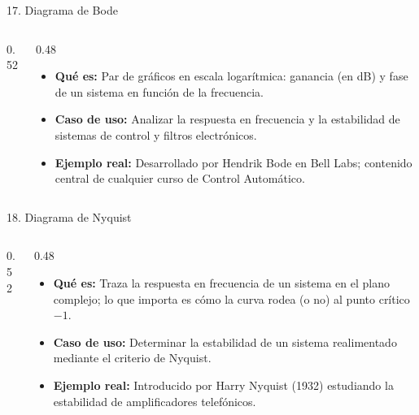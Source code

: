 \documentclass[aspectratio=169,9pt]{beamer}
\newcommand{\ficha}[3]{%
\begin{itemize}
\item \textbf{Qué es:} #1
\item \textbf{Caso de uso:} #2
\item \textbf{Ejemplo real:} #3
\end{itemize}}
\begin{document}
\begin{frame}{17. Diagrama de Bode}
\begin{columns}[T]
\begin{column}{0.52\textwidth}
\centering
{}
\end{column}
\begin{column}{0.48\textwidth}
\ficha{Par de gráficos en escala logarítmica: ganancia (en dB) y fase de un sistema en función de la frecuencia.}
{Analizar la respuesta en frecuencia y la estabilidad de sistemas de control y filtros electrónicos.}
{Desarrollado por Hendrik Bode en Bell Labs; contenido central de cualquier curso de Control Automático.}
\end{column}
\end{columns}
\end{frame}

\begin{frame}{18. Diagrama de Nyquist}
\begin{columns}[T]
\begin{column}{0.52\textwidth}
\centering
{}
\end{column}
\begin{column}{0.48\textwidth}
\ficha{Traza la respuesta en frecuencia de un sistema en el plano complejo; lo que importa es cómo la curva rodea (o no) al punto crítico $-1$.}
{Determinar la estabilidad de un sistema realimentado mediante el criterio de Nyquist.}
{Introducido por Harry Nyquist (1932) estudiando la estabilidad de amplificadores telefónicos.}
\end{column}
\end{columns}
\end{frame}
\end{document}
